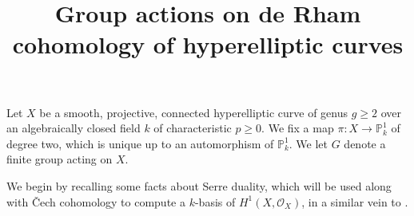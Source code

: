 \documentclass[draft, 11pt]{article} %
\title{Group actions on de Rham cohomology of hyperelliptic curves}
\author{}
\theoremstyle{plain}
\theoremstyle{remark}
\newcommand{\cech}{\v{C}ech }
\newcommand{\hone}{H^1(X,\mathcal{O}_X)}
\begin{document}
\maketitle

\listoftodos

Let $X$ be a smooth, projective, connected hyperelliptic curve of genus $g \geq 2$ over an algebraically closed field $k$ of characteristic $p \geq 0$.
We  fix a map $\pi \colon X \rightarrow \mathbb P_k^1$ of degree two, which is unique up to an automorphism of $\mathbb P_k^1$.
We let $G$ denote a finite group acting on $X$.

We begin by recalling some facts about Serre duality, which will be used along with \cech cohomology to compute a $k$-basis of $\hone$, in a similar vein to \cite{canonicalrepresentation}.
\end{document}
